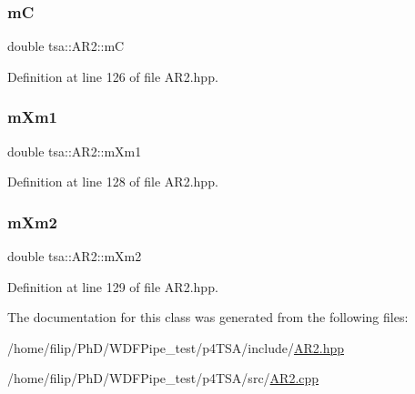 \subsubsection{\texorpdfstring{mC}{mC}}
{\footnotesize\ttfamily double tsa\+::\+A\+R2\+::mC\hspace{0.3cm}{\ttfamily [private]}}



Definition at line 126 of file A\+R2.\+hpp.

\mbox{\label{classtsa_1_1_a_r2_a855a67e26b267c41a48b5eb48d35ec06}} 
\subsubsection{\texorpdfstring{m\+Xm1}{mXm1}}
{\footnotesize\ttfamily double tsa\+::\+A\+R2\+::m\+Xm1\hspace{0.3cm}{\ttfamily [private]}}



Definition at line 128 of file A\+R2.\+hpp.

\mbox{\label{classtsa_1_1_a_r2_add01d087af153e0addabb8c5b98318e4}} 
\subsubsection{\texorpdfstring{m\+Xm2}{mXm2}}
{\footnotesize\ttfamily double tsa\+::\+A\+R2\+::m\+Xm2\hspace{0.3cm}{\ttfamily [private]}}



Definition at line 129 of file A\+R2.\+hpp.



The documentation for this class was generated from the following files\+:\begin{DoxyCompactItemize}
\item 
/home/filip/\+Ph\+D/\+W\+D\+F\+Pipe\+\_\+test/p4\+T\+S\+A/include/\hyperlink{_a_r2_8hpp}{A\+R2.\+hpp}\item 
/home/filip/\+Ph\+D/\+W\+D\+F\+Pipe\+\_\+test/p4\+T\+S\+A/src/\hyperlink{_a_r2_8cpp}{A\+R2.\+cpp}\end{DoxyCompactItemize}
